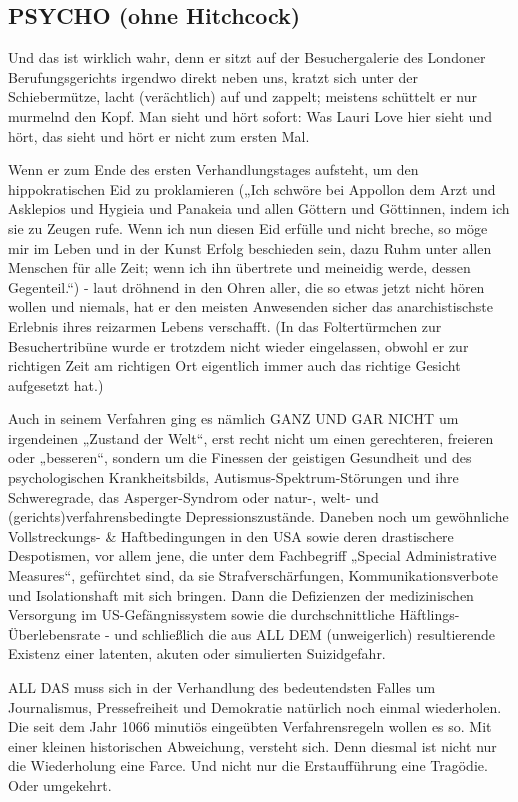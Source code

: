 \begin{multicols}{2}

\chapter{PSYCHO (ohne Hitchcock)}
Und das ist wirklich wahr, denn er sitzt auf der Besuchergalerie des Londoner Berufungsgerichts irgendwo
direkt neben uns, kratzt sich unter der Schiebermütze,
lacht (verächtlich) auf und zappelt; meistens schüttelt
er nur murmelnd den Kopf. Man sieht und hört sofort:
Was Lauri Love hier sieht und hört, das sieht und hört er
nicht zum ersten Mal.

Wenn er zum Ende des ersten Verhandlungstages aufsteht, um den hippokratischen Eid zu proklamieren
(„Ich schwöre bei Appollon dem Arzt und Asklepios und
Hygieia und Panakeia und allen Göttern und Göttinnen,
indem ich sie zu Zeugen rufe. Wenn ich nun diesen Eid
erfülle und nicht breche, so möge mir im Leben und in
der Kunst Erfolg beschieden sein, dazu Ruhm unter allen Menschen für alle Zeit; wenn ich ihn übertrete und
meineidig werde, dessen Gegenteil.“) - laut dröhnend
in den Ohren aller, die so etwas jetzt nicht hören wollen und niemals, hat er den meisten Anwesenden sicher
das anarchistischste Erlebnis ihres reizarmen Lebens
verschafft. (In das Foltertürmchen zur Besuchertribüne wurde er trotzdem nicht wieder eingelassen, obwohl
er zur richtigen Zeit am richtigen Ort eigentlich immer
auch das richtige Gesicht aufgesetzt hat.)

Auch in seinem Verfahren ging es nämlich GANZ UND
GAR NICHT um irgendeinen „Zustand der Welt“, erst
recht nicht um einen gerechteren, freieren oder „besseren“, sondern um die Finessen der geistigen Gesundheit und des psychologischen Krankheitsbilds, Autismus-Spektrum-Störungen und ihre Schweregrade, das
Asperger-Syndrom oder natur-, welt- und (gerichts)verfahrensbedingte Depressionszustände. Daneben noch
um gewöhnliche Vollstreckungs- \& Haftbedingungen
in den USA sowie deren drastischere Despotismen, vor
allem jene, die unter dem Fachbegriff „Special Administrative Measures“, gefürchtet sind, da sie Strafverschärfungen, Kommunikationsverbote und Isolationshaft mit
sich bringen. Dann die Defizienzen der medizinischen
Versorgung im US-Gefängnissystem sowie die durchschnittliche Häftlings-Überlebensrate - und schließlich
die aus ALL DEM (unweigerlich) resultierende Existenz
einer latenten, akuten oder simulierten Suizidgefahr.

ALL DAS muss sich in der Verhandlung des bedeutendsten Falles um Journalismus, Pressefreiheit und Demokratie natürlich noch einmal wiederholen. Die seit dem
Jahr 1066 minutiös eingeübten Verfahrensregeln wollen
es so. Mit einer kleinen historischen Abweichung, versteht sich. Denn diesmal ist nicht nur die Wiederholung
eine Farce. Und nicht nur die Erstaufführung eine Tragödie. Oder umgekehrt.


\end{multicols}
